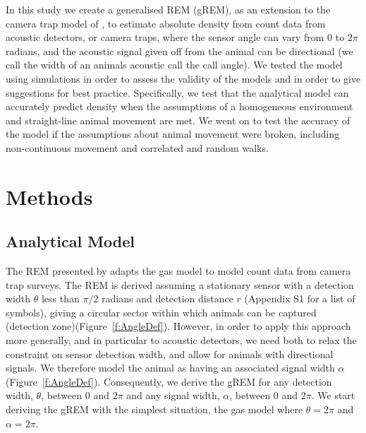 \documentclass[a4paper,10pt,reqno,oneside]{amsart}
\begin{document}

In this study we create a generalised REM (gREM), as an extension to the camera trap model of \citep{rowcliffe2008estimating}, to estimate absolute density from count data from acoustic detectors, or camera traps, where the sensor angle can vary from 0 to $2\pi$ radians, and the acoustic signal given off from the animal can be directional (we call the width of an animals acoustic call the call angle).  We tested the model using simulations in order to assess the validity of the models and in order to give suggestions for best practice. Specifically, we test that the analytical model can accurately predict density when the assumptions of a homogeneous environment and straight-line animal movement are met. We went on to test the accuracy of the model if the assumptions about animal movement were broken, including non-continuous movement and correlated and random walks. 

\section{Methods}

\subsection{Analytical Model}

The REM presented by \citep{rowcliffe2008estimating} adapts the gas model to model count data from camera trap surveys. The REM is derived assuming a stationary sensor with a detection width $\theta$ less than $\pi/2$ radians and detection distance $r$ (Appendix S1 for a list of symbols), giving a circular sector within which animals can be captured (detection zone)(Figure~\ref{f:AngleDef}). However, in order to apply this approach more generally, and in particular to acoustic detectors, we need both to relax the constraint on sensor detection width, and allow for animals with directional signals. We therefore model the animal as having an associated signal width $\alpha$ (Figure~\ref{f:AngleDef}). Consequently, we derive the gREM for any detection width, $ \theta$, between 0 and $2\pi$ and any signal width, $ \alpha$, between 0 and $2\pi$. We start deriving the gREM with the simplest situation, the gas model where $\theta =  2\pi$ and $ \alpha =  2\pi$. 
\end{document}
